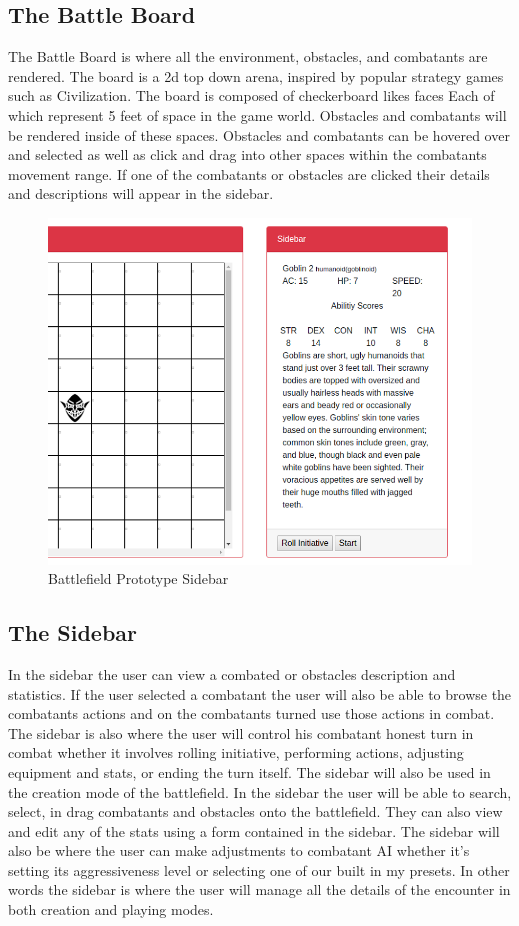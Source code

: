 \documentclass[12pt,a4paper]{report}
\begin{document}
	\subsection {The Battle Board }
	The Battle Board is where all the environment, obstacles, and combatants are rendered. The board is a 2d top down arena, inspired by popular strategy games such as Civilization. The board is composed of checkerboard likes faces Each of which represent 5 feet of space in the game world. Obstacles and combatants will be rendered inside of these spaces. Obstacles and combatants can be hovered over and selected as well as click and drag into other spaces within the combatants movement range. If one of the combatants or obstacles are clicked their details and descriptions will appear in the sidebar. 
	\begin{figure}[H]
		\centering
		\includegraphics[scale=.5]{encountercreatorsidebar}
		\caption{Battlefield Prototype Sidebar}
		\label{fig: Battlefield Prototype Sidebar}
	\end{figure}
	\subsection {The Sidebar }
	In the sidebar the user can view a combated or obstacles description and statistics. If the user selected a combatant the user will also be able to browse the combatants actions and on the combatants turned use those actions in combat. The sidebar is also where the user will control his combatant honest turn in combat whether it involves rolling initiative, performing actions, adjusting equipment and stats, or ending the turn itself. The sidebar will also be used in the creation mode of the battlefield. In the sidebar the user will be able to search, select, in drag combatants and obstacles onto the battlefield. They can also view and edit any of the stats using a form contained in the sidebar. The sidebar will also be where the user can make adjustments to combatant AI whether it's setting its aggressiveness level or selecting one of our built in my presets. In other words the sidebar is where the user will manage all the details of the encounter in both creation and playing modes. 
\end{document}
